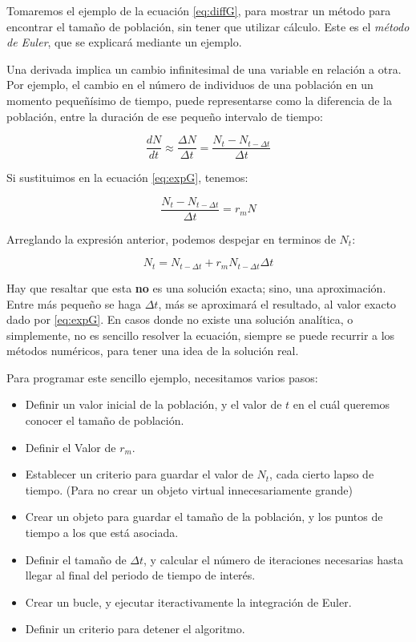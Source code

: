 \documentclass[12pt,letterpaper,]{book}
\begin{document}
Tomaremos el ejemplo de la ecuación \eqref{eq:diffG}, para mostrar un
método para encontrar el tamaño de población, sin tener que utilizar
cálculo. Este es el \emph{método de Euler}, que se explicará mediante un
ejemplo.

Una derivada implica un cambio infinitesimal de una variable en relación
a otra. Por ejemplo, el cambio en el número de individuos de una
población en un momento pequeñísimo de tiempo, puede representarse como
la diferencia de la población, entre la duración de ese pequeño
intervalo de tiempo:

\[
\frac{dN}{dt} \approx \frac{\Delta N}{\Delta t} = \frac{N_t - N_{t-\Delta t}}{\Delta t}
\]

Si sustituimos en la ecuación \eqref{eq:expG}, tenemos:

\[
\frac{N_t - N_{t-\Delta t}}{\Delta t} = r_m N
\]

Arreglando la expresión anterior, podemos despejar en terminos de
\(N_t\):

\[
N_t= N_{t-\Delta t} + r_m N_{t-\Delta t} \Delta t
\]

Hay que resaltar que esta \textbf{no} es una solución exacta; sino, una
aproximación. Entre más pequeño se haga \(\Delta t\), más se aproximará
el resultado, al valor exacto dado por \eqref{eq:expG}. En casos donde no
existe una solución analítica, o simplemente, no es sencillo resolver la
ecuación, siempre se puede recurrir a los métodos numéricos, para tener
una idea de la solución real.

Para programar este sencillo ejemplo, necesitamos varios pasos:

\begin{itemize}
\item
  Definir un valor inicial de la población, y el valor de \(t\) en el
  cuál queremos conocer el tamaño de población.
\item
  Definir el Valor de \(r_m\).
\item
  Establecer un criterio para guardar el valor de \(N_t\), cada cierto
  lapso de tiempo. (Para no crear un objeto virtual innecesariamente
  grande)
\item
  Crear un objeto para guardar el tamaño de la población, y los puntos
  de tiempo a los que está asociada.
\item
  Definir el tamaño de \(\Delta t\), y calcular el número de iteraciones
  necesarias hasta llegar al final del periodo de tiempo de interés.
\item
  Crear un bucle, y ejecutar iteractivamente la integración de Euler.
\item
  Definir un criterio para detener el algoritmo.
\end{itemize}
\end{document}
